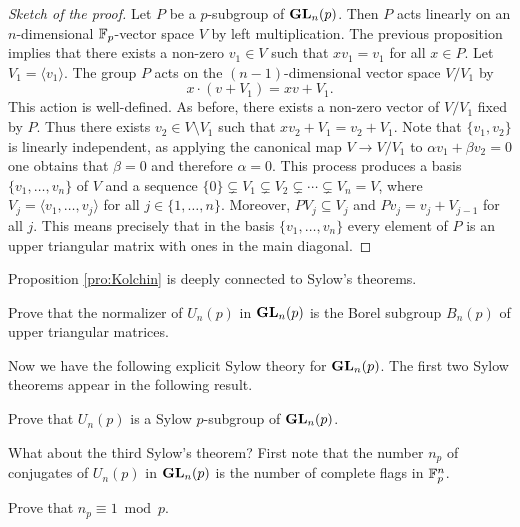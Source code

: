 \begin{proof}[Sketch of the proof]
    Let $P$ be a $p$-subgroup of $\mathbf{GL}_n(p)$. 
    Then $P$ acts linearly on an $n$-dimensional 
    $\mathbb{F}_p$-vector space $V$ by left multiplication. 
    The previous
    proposition implies that there exists a non-zero
    $v_1\in V$
    such that $xv_1=v_1$ for all $x\in P$. Let 
    $V_1=\langle v_1\rangle$. The group $P$ 
    acts on the $(n-1)$-dimensional vector space 
    $V/V_1$ by 
    \[
    x\cdot (v+V_1)=xv+V_1.
    \]
    This action is well-defined. 
    As before, there exists a non-zero 
    vector of $V/V_1$ fixed by $P$. Thus 
    there exists $v_2\in V\setminus V_1$ such that 
    $xv_2+V_1=v_2+V_1$. Note that $\{v_1,v_2\}$ is linearly
    independent, as applying the canonical
    map $V\to V/V_1$ to 
    $\alpha v_1+\beta v_2=0$ one obtains
    that $\beta=0$ and therefore $\alpha=0$. This process
    produces a basis $\{v_1,\dots,v_n\}$ 
    of $V$ and a sequence $\{0\}\subsetneq V_1\subsetneq V_2\subsetneq\cdots\subsetneq V_n=V$, where 
    $V_j=\langle v_1,\dots,v_j\rangle$ for all $j\in\{1,\dots,n\}$. Moreover,  
    $PV_j\subseteq V_j$  and 
    $Pv_j=v_j+V_{j-1}$ for all $j$. This
    means precisely that in the basis 
    $\{v_1,\dots,v_n\}$ 
    every element of $P$ is an upper triangular
    matrix with ones in the main diagonal. 
\end{proof}

Proposition \ref{pro:Kolchin} is deeply 
connected to Sylow's theorems. 

\begin{exercise}
    Prove that the normalizer of $U_n(p)$ in $\mathbf{GL}_n(p)$ is the
    Borel subgroup $B_n(p)$ of upper triangular matrices. 
\end{exercise}

Now we have the following explicit Sylow theory for
$\mathbf{GL}_n(p)$. The first two Sylow theorems 
appear in the following result. 

\begin{exercise}
    Prove that  $U_n(p)$ is a Sylow $p$-subgroup of $\mathbf{GL}_n(p)$. 
\end{exercise}

What about the third Sylow's theorem? 
First note that the number $n_p$
of conjugates of $U_n(p)$ in $\mathbf{GL}_n(p)$ 
is the number of complete flags 
in $\mathbb{F}_p^n$.

\begin{exercise}
    Prove that $n_p\equiv1\bmod p$. 
\end{exercise}

